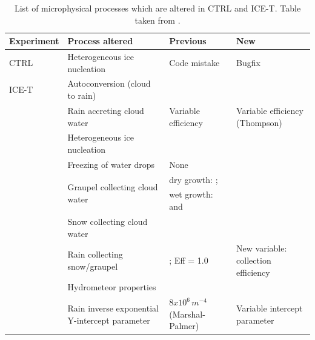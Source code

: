 \documentclass{ametsocV5}
\begin{document}
%
\begin{table}[t]
	\caption{List of microphysical processes which are altered in CTRL and ICE-T. Table taken from \cite{engdahl_improving_2020}.}
	\label{tab:micr_changes}
	\begin{center}
		\begin{tabular}{p{}||p{}|p{}|p{}} \hline\hline
			Experiment & Process altered               & Previous     & New \\ \hline \hline
			CTRL       & Heterogeneous ice nucleation  & Code mistake & Bugfix \\\hline
			ICE-T      & Autoconversion (cloud to rain)&\citet{khairoutdinov_new_2000} &\citet{berry_analysis_1974}\\
			& Rain accreting cloud water      & Variable efficiency \citep{muller_arome-metcoop:_2017}   & Variable efficiency (Thompson) \\
			& Heterogeneous ice nucleation    & \citet{meyers_new_1992}          & \citet{cooper_ice_1986} \\
			& Freezing of water drops        & None                         & \citet{bigg_supercooling_1953} \\
			& \multirow{2}{*}{Graupel collecting cloud water} & dry growth: \citet{ferrier_double-moment_1994}; & \multirow{2}{*}{\citet{cober_measurements_1993}} \\
			&                                                  & wet growth: \citet{musil_computer_1970} and \citet{nelson_influence_1983} &\\
			& Snow collecting cloud water     & \citet{farley_numerical_1989} & \citet{wang_collision_2000} \\
			& Rain collecting snow/graupel    & \citet{ferrier_double-moment_1994}; Eff = 1.0 & New variable: collection efficiency \\
			& Hydrometeor properties         & \citet{locatelli_fall_1974} & \citet{thompson_explicit_2008} \\
			& Rain inverse exponential Y-intercept parameter & $8x10^{6}\, m^{-4}$ (Marshal-Palmer) & Variable intercept parameter \citep{thompson_explicit_2004} \\ \hline

			
		\end{tabular}
	\end{center}
\end{table}
\end{document}

